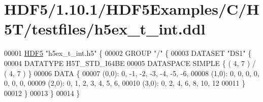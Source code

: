 \hypertarget{_h_d_f5_21_810_81_2_h_d_f5_examples_2_c_2_h5_t_2testfiles_2h5ex__t__int_8ddl_source}{}\section{H\+D\+F5/1.10.1/\+H\+D\+F5\+Examples/\+C/\+H5\+T/testfiles/h5ex\+\_\+t\+\_\+int.ddl}
\label{_h_d_f5_21_810_81_2_h_d_f5_examples_2_c_2_h5_t_2testfiles_2h5ex__t__int_8ddl_source}

\begin{DoxyCode}
00001 \hyperlink{namespace_h_d_f5}{HDF5} \textcolor{stringliteral}{"h5ex\_t\_int.h5"} \{
00002 GROUP \textcolor{stringliteral}{"/"} \{
00003    DATASET \textcolor{stringliteral}{"DS1"} \{
00004       DATATYPE  H5T\_STD\_I64BE
00005       DATASPACE  SIMPLE \{ ( 4, 7 ) / ( 4, 7 ) \}
00006       DATA \{
00007       (0,0): 0, -1, -2, -3, -4, -5, -6,
00008       (1,0): 0, 0, 0, 0, 0, 0, 0,
00009       (2,0): 0, 1, 2, 3, 4, 5, 6,
00010       (3,0): 0, 2, 4, 6, 8, 10, 12
00011       \}
00012    \}
00013 \}
00014 \}
\end{DoxyCode}
